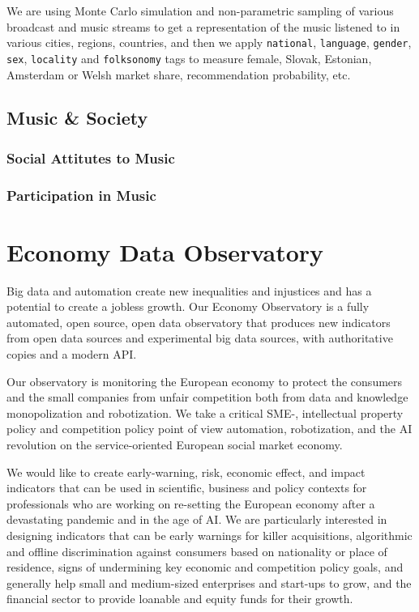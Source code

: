 \documentclass[
  a4paper,
  openany, a4paper, oneside]{book}
\begin{document}
We are using Monte Carlo simulation and non-parametric sampling of various broadcast and music streams to get a representation of the music listened to in various cities, regions, countries, and then we apply \texttt{national}, \texttt{language}, \texttt{gender}, \texttt{sex}, \texttt{locality} and \texttt{folksonomy} tags to measure female, Slovak, Estonian, Amsterdam or Welsh market share, recommendation probability, etc.

\hypertarget{music-society}{%
\section{Music \& Society}\label{music-society}}

\hypertarget{social-attitutes-to-music}{%
\subsection{Social Attitutes to Music}\label{social-attitutes-to-music}}

\hypertarget{participation-in-music}{%
\subsection{Participation in Music}\label{participation-in-music}}

\hypertarget{economy}{%
\chapter{Economy Data Observatory}\label{economy}}

Big data and automation create new inequalities and injustices and has a potential to create a jobless growth. Our Economy Observatory is a fully automated, open source, open data observatory that produces new indicators from open data sources and experimental big data sources, with authoritative copies and a modern API.

Our observatory is monitoring the European economy to protect the consumers and the small companies from unfair competition both from data and knowledge monopolization and robotization. We take a critical SME-, intellectual property policy and competition policy point of view automation, robotization, and the AI revolution on the service-oriented European social market economy.

We would like to create early-warning, risk, economic effect, and impact indicators that can be used in scientific, business and policy contexts for professionals who are working on re-setting the European economy after a devastating pandemic and in the age of AI. We are particularly interested in designing indicators that can be early warnings for killer acquisitions, algorithmic and offline discrimination against consumers based on nationality or place of residence, signs of undermining key economic and competition policy goals, and generally help small and medium-sized enterprises and start-ups to grow, and the financial sector to provide loanable and equity funds for their growth.
\end{document}
